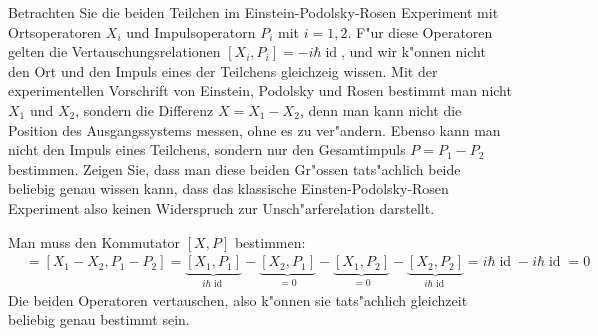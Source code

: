 Betrachten Sie die beiden Teilchen im Einstein-Podolsky-Rosen Experiment
mit Ortsoperatoren $X_i$ und Impulsoperatorn $P_i$ mit $i=1,2$.
F"ur diese Operatoren gelten die Vertauschungsrelationen
$[X_i,P_i]=-i\hbar\operatorname{id}$, und wir k"onnen nicht
den Ort und den Impuls eines der Teilchens gleichzeig wissen.
Mit der experimentellen Vorschrift von Einstein, Podolsky und Rosen
bestimmt man nicht $X_1$ und $X_2$, sondern
die Differenz $X=X_1-X_2$, denn man kann nicht die Position des
Ausgangssystems messen, ohne es zu ver"andern. Ebenso kann man nicht
den Impuls eines Teilchens, sondern nur den Gesamtimpuls $P=P_1-P_2$ 
bestimmen. Zeigen Sie, dass man diese beiden Gr"ossen tats"achlich
beide beliebig genau wissen kann, dass das klassische Einsten-Podolsky-Rosen
Experiment also keinen Widerspruch zur Unsch"arferelation darstellt.

\begin{loesung}
Man muss den Kommutator $[X,P]$ bestimmen:
\begin{align*}
[X,P]
&=
[X_1-X_2,P_1-P_2]
=
\underbrace{[X_1,P_1]}_{i\hbar\operatorname{id}}
-\underbrace{[X_2,P_1]}_{=0}
-\underbrace{[X_1,P_2]}_{=0}
-\underbrace{[X_2,P_2]}_{i\hbar\operatorname{id}}
=
i\hbar\operatorname{id}
-i\hbar\operatorname{id}
=0
\end{align*}
Die beiden Operatoren vertauschen, also k"onnen sie tats"achlich gleichzeit
beliebig genau bestimmt sein.
\end{loesung}


